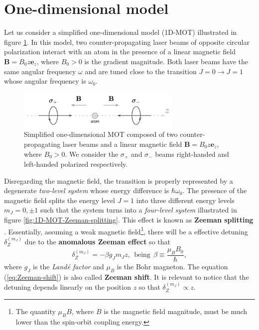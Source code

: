 %
\section{One-dimensional model}
\label{sec:one-dimensional-model}
%

Let us consider a simplified one-dimensional model (1D-MOT) illustrated in figure \ref{fig:1D-MOT}. In this model, two counter-propagating laser beams of opposite circular polarization interact with an atom in the presence of a linear magnetic field $ \mathbf{B} = B_0 z \mathbf{e}_z $, where $ B_0 > 0 $ is the gradient magnitude. Both laser beams have the same angular frequency $ \omega $ and are tuned close to the transition $ J = 0 \rightarrow J = 1 $ whose angular frequency is $ \omega_0 $.

\begin{figure}[!ht]
	\centering
	\includegraphics[width=0.7\textwidth]{USPSC-img/1D-MOT.png}
	\vspace{5pt}
	\caption{Simplified one-dimensional MOT composed of two counter-propagating laser beams and a linear magnetic field $ \mathbf{B} = B_0 z \mathbf{e}_z $, where $ B_0 > 0 $. We consider the $ \sigma_{+} $ and $ \sigma_{-} $ beams right-handed and left-handed polarized respectively.}
	\label{fig:1D-MOT}
	\vspace{-10pt}
\end{figure}

Disregarding the magnetic field, the transition is properly represented by a degenerate \textit{two-level system} whose energy difference is $ \hbar \omega_0 $. The presence of the magnetic field splits the energy level $ J = 1 $ into three different energy levels $ m_J = 0, \pm 1 $ such that the system turns into a \textit{four-level system} illustrated in figure \ref{fig:1D-MOT-Zeeman-splitting}. This effect is known as \textbf{Zeeman splitting} \cite[Section~7.4]{steck2007quantum}. Essentially, assuming a weak magnetic field\footnote{The quantity $ \mu_B B $, where $ B $ is the magnetic field magnitude, must be much lower than the spin-orbit coupling energy.}, there will be a effective detuning $ \delta_Z^{(m_J)} $ due to the \textbf{anomalous Zeeman effect} so that
\begin{equation}
	\delta_Z^{(m_J)} = - \beta g_{J} m_J z,\ \ \textrm{being}\ \ \beta \equiv \frac{\mu_B B_0}{\hbar},
	\label{eq:Zeeman-shift}
\end{equation}
where $ g_J $ is the \textit{Landé factor} and $ \mu_B $ is the Bohr magneton. The equation (\ref{eq:Zeeman-shift}) is also called \textbf{Zeeman shift}. It is relevant to notice that the detuning depends linearly on the position $ z $ so that $ \delta_Z^{(m_J)} \propto z $.


